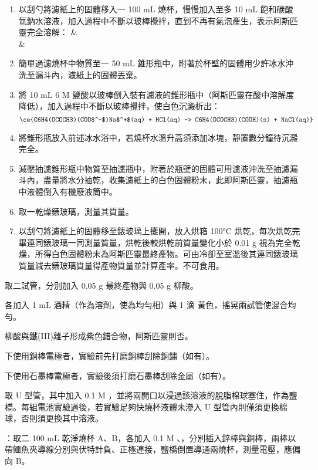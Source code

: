 \documentclass[a4paper,12pt]{article}
\begin{document}
\begin{enumerate}
\item 以刮勺將濾紙上的固體移入一 100 mL 燒杯，慢慢加入至多 10 mL 飽和碳酸氫鈉水溶液，加入過程中不斷以玻棒攪拌，直到不再有氣泡產生，表示阿斯匹靈完全溶解：
\bma
& \\
\tx{\ce{->}} & 
\eam
\item 簡單過濾燒杯中物質至一 50 mL 錐形瓶中，附著於杯壁的固體用少許冰水沖洗至漏斗內，濾紙上的固體丟棄。
\item 將 10 mL 6 M 鹽酸以玻棒倒入裝有濾液的錐形瓶中（阿斯匹靈在酸中溶解度降低），加入過程中不斷以玻棒攪拌，使白色沉澱析出：
\[\ce{C6H4(OCOCH3)(COO$^-$)Na$^+$(aq) + HCl(aq) -> C6H4(OCOCH3)(COOH)(s) + NaCl(aq)}\]
\item 將錐形瓶放入前述冰水浴中，若燒杯水溫升高須添加冰塊，靜置數分鐘待沉澱完全。
\item 減壓抽濾錐形瓶中物質至抽濾瓶中，附著於瓶壁的固體可用濾液沖洗至抽濾漏斗內，盡量將水分抽乾，收集濾紙上的白色固體粉末，此即阿斯匹靈，抽濾瓶中液體倒入有機廢液筒中。
\item 取一乾燥錶玻璃，測量其質量。
\item 以刮勺將濾紙上的固體移至錶玻璃上攤開，放入烘箱 100°C 烘乾，每次烘乾完畢連同錶玻璃一同測量質量，烘乾後較烘乾前質量變化小於 0.01 g 視為完全乾燥，所得白色固體粉末為阿斯匹靈最終產物。可由冷卻至室溫後其連同錶玻璃質量減去錶玻璃質量得產物質量並計算產率。不可食用。
\end{enumerate}
\ben
\item 取二試管，分別加入 0.05 g 最終產物與 0.05 g 柳酸。
\item 各加入 1 mL 酒精（作為溶劑，使為均勻相）與 1 滴 黃色，搖晃兩試管使混合均勻。
\item 柳酸與鐵(III)離子形成紫色錯合物，阿斯匹靈則否。
\een
{}
\ben
\item 下使用銅棒電極者，實驗前先打磨銅棒刮除銅鏽（如有）。
\item 下使用石墨棒電極者，實驗後須打磨石墨棒刮除金屬（如有）。
\item 取 U 型管，其中加入 0.1 M  ，並將兩開口以浸過該溶液的脫脂棉球塞住，作為鹽橋。每組電池實驗過後，若實驗足夠快燒杯液體未滲入 U 型管內則僅須更換棉球，否則須更換其中溶液。
\item {}：取二 100 mL 乾淨燒杯 A、B，各加入 0.1 M 、，分別插入鋅棒與銅棒，兩棒以帶鱷魚夾導線分別與伏特計負、正極連接，鹽橋倒置導通兩燒杯，測量電壓，應偏向 B。
\end{document}
